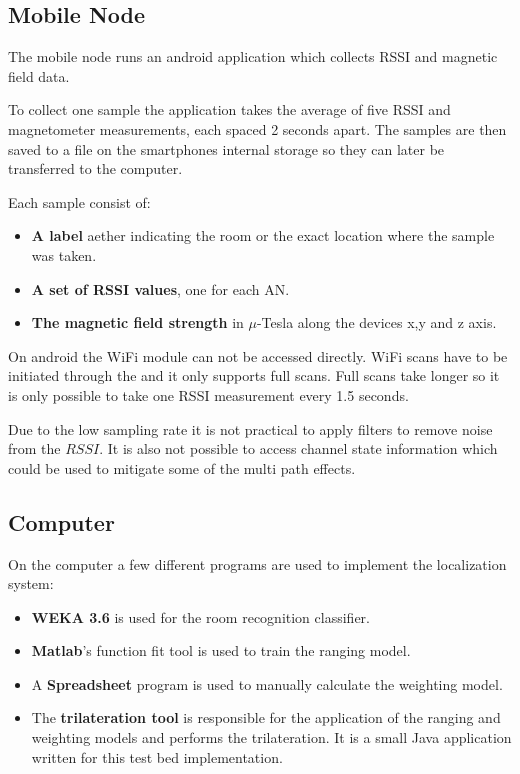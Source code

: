 \subsection{Mobile Node}

The mobile node runs an android application which collects RSSI and magnetic field data.

To collect one sample the application takes the average of five RSSI and magnetometer measurements, each spaced 2 seconds apart. The samples are then saved to a  file on the smartphones internal storage so they can later be transferred to the computer.

Each sample consist of:
\begin{itemize}
\item \textbf{A label} aether indicating the room or the exact location where the sample was taken.
\item \textbf{A set of RSSI values}, one for each AN.
\item \textbf{The magnetic field strength} in \(\mu\)-Tesla along the devices x,y and z axis.
\end{itemize}

On android the WiFi module can not be accessed directly. WiFi scans have to be initiated through the  and it only supports full scans\cite{brouwers2014incremental}. Full scans take longer so it is only possible to take one RSSI measurement every 1.5 seconds.

Due to the low sampling rate it is not practical to apply filters to remove noise from the $RSSI$. It is also not possible to access channel state information which could be used to mitigate some of the multi path effects.

\subsection{Computer}

On the computer a few different programs are used to implement the localization system:
\begin{itemize}
\item \textbf{WEKA 3.6} is used for the room recognition classifier.

\item \textbf{Matlab}'s function fit tool is used to train the ranging model.

\item A \textbf{Spreadsheet} program is used to manually calculate the weighting model.


\item The \textbf{trilateration tool} is responsible for the application of the ranging and weighting models and performs the trilateration. It is a small Java application written for this test bed implementation.

\end{itemize}

